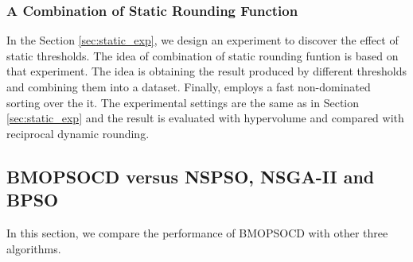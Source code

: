 \subsubsection{A Combination of Static Rounding Function}
In the Section \ref{sec:static_exp}, we design an experiment to discover the effect of static thresholds. The idea of combination of static rounding funtion
is based on that experiment. The idea is obtaining the result produced by different thresholds and combining them into a dataset. Finally, 
employs a fast non-dominated sorting over the it. The experimental settings are the same as in Section \ref{sec:static_exp} and the result is 
evaluated with hypervolume and compared with reciprocal dynamic rounding.

\subsection{BMOPSOCD versus NSPSO, NSGA-II and BPSO}

In this section, we compare the performance of BMOPSOCD with other three algorithms.

